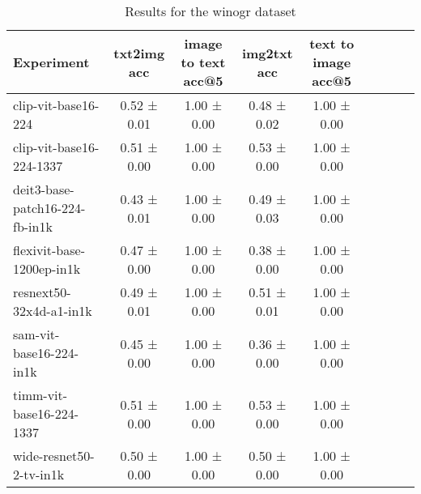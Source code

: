 \begin{table}[htbp]
\caption{Results for the winogr dataset}
\begin{tabular}{|l|c|c|c|c|c|c|c|c|}\hline
Experiment & txt2img acc & image to text acc@5 & img2txt acc & text to image acc@5\\
\hline
clip-vit-base16-224 & 0.52 ± 0.01 & 1.00 ± 0.00 & 0.48 ± 0.02 & 1.00 ± 0.00\\
\hline
clip-vit-base16-224-1337 & 0.51 ± 0.00 & 1.00 ± 0.00 & 0.53 ± 0.00 & 1.00 ± 0.00\\
\hline
deit3-base-patch16-224-fb-in1k & 0.43 ± 0.01 & 1.00 ± 0.00 & 0.49 ± 0.03 & 1.00 ± 0.00\\
\hline
flexivit-base-1200ep-in1k & 0.47 ± 0.00 & 1.00 ± 0.00 & 0.38 ± 0.00 & 1.00 ± 0.00\\
\hline
resnext50-32x4d-a1-in1k & 0.49 ± 0.01 & 1.00 ± 0.00 & 0.51 ± 0.01 & 1.00 ± 0.00\\
\hline
sam-vit-base16-224-in1k & 0.45 ± 0.00 & 1.00 ± 0.00 & 0.36 ± 0.00 & 1.00 ± 0.00\\
\hline
timm-vit-base16-224-1337 & 0.51 ± 0.00 & 1.00 ± 0.00 & 0.53 ± 0.00 & 1.00 ± 0.00\\
\hline
wide-resnet50-2-tv-in1k & 0.50 ± 0.00 & 1.00 ± 0.00 & 0.50 ± 0.00 & 1.00 ± 0.00\\
\hline
\end{tabular}
\end{table}

